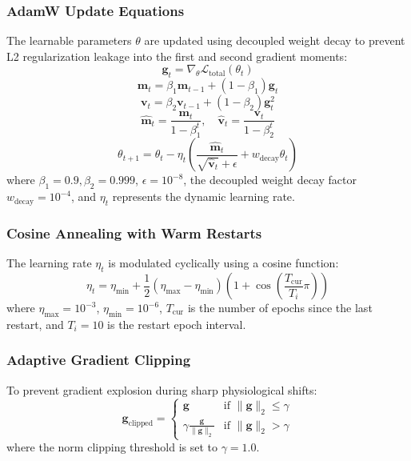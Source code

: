 \documentclass[10pt,journal,compsoc,twocolumn]{IEEEtran}
\begin{document}
\subsubsection{AdamW Update Equations}
The learnable parameters $\theta$ are updated using decoupled weight decay to prevent L2 regularization leakage into the first and second gradient moments:
\begin{equation}
\mathbf{g}_t = \nabla_{\theta} \mathcal{L}_{\text{total}}(\theta_t)
\end{equation}
\begin{equation}
\mathbf{m}_t = \beta_1 \mathbf{m}_{t-1} + (1 - \beta_1)\mathbf{g}_t
\end{equation}
\begin{equation}
\mathbf{v}_t = \beta_2 \mathbf{v}_{t-1} + (1 - \beta_2)\mathbf{g}_t^2
\end{equation}
\begin{equation}
\hat{\mathbf{m}}_t = \frac{\mathbf{m}_t}{1 - \beta_1^t}, \quad \hat{\mathbf{v}}_t = \frac{\mathbf{v}_t}{1 - \beta_2^t}
\end{equation}
\begin{equation}
\theta_{t+1} = \theta_t - \eta_t \left( \frac{\hat{\mathbf{m}}_t}{\sqrt{\hat{\mathbf{v}}_t} + \epsilon} + w_{\text{decay}}\theta_t \right)
\end{equation}
where $\beta_1 = 0.9, \beta_2 = 0.999$, $\epsilon = 10^{-8}$, the decoupled weight decay factor $w_{\text{decay}} = 10^{-4}$, and $\eta_t$ represents the dynamic learning rate.

\subsubsection{Cosine Annealing with Warm Restarts}
The learning rate $\eta_t$ is modulated cyclically using a cosine function:
\begin{equation}
\eta_t = \eta_{\text{min}} + \frac{1}{2}\left(\eta_{\text{max}} - \eta_{\text{min}}\right)\left(1 + \cos\left(\frac{T_{\text{cur}}}{T_i}\pi\right)\right)
\end{equation}
where $\eta_{\text{max}} = 10^{-3}$, $\eta_{\text{min}} = 10^{-6}$, $T_{\text{cur}}$ is the number of epochs since the last restart, and $T_i = 10$ is the restart epoch interval.

\subsubsection{Adaptive Gradient Clipping}
To prevent gradient explosion during sharp physiological shifts:
\begin{equation}
\mathbf{g}_{\text{clipped}} = \begin{cases} \mathbf{g} & \text{if } \|\mathbf{g}\|_2 \le \gamma \\ \gamma \frac{\mathbf{g}}{\|\mathbf{g}\|_2} & \text{if } \|\mathbf{g}\|_2 > \gamma \end{cases}
\end{equation}
where the norm clipping threshold is set to $\gamma = 1.0$.
\end{document}
